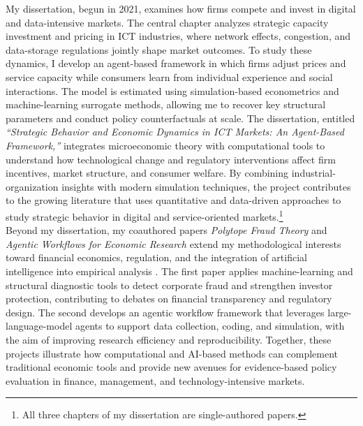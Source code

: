 \documentclass{nfr}
\begin{document}
My dissertation, begun in 2021, examines how firms compete and invest in digital and data-intensive markets. 
The central chapter analyzes strategic capacity investment and pricing in ICT industries, where network effects, congestion, and data-storage regulations jointly shape market outcomes. 
To study these dynamics, I develop an agent-based framework in which firms adjust prices and service capacity while consumers learn from individual experience and social interactions. 
The model is estimated using simulation-based econometrics and machine-learning surrogate methods, allowing me to recover key structural parameters and conduct policy counterfactuals at scale.
The dissertation, entitled \textit{“Strategic Behavior and Economic Dynamics in ICT Markets: An Agent-Based Framework,”} integrates microeconomic theory with computational tools to understand how technological change and regulatory interventions affect firm incentives, market structure, and consumer welfare. 
By combining industrial-organization insights with modern simulation techniques, the project contributes to the growing literature that uses quantitative and data-driven approaches to study strategic behavior in digital and service-oriented markets.\footnote{All three chapters of my dissertation are single-authored papers.}\\

Beyond my dissertation, my coauthored papers \textit{Polytope Fraud Theory} and \textit{Agentic Workflows for Economic Research} extend my methodological interests toward financial economics, regulation, and the integration of artificial intelligence into empirical analysis \citep{Zhao2025, Dawid2025}. 
The first paper applies machine-learning and structural diagnostic tools to detect corporate fraud and strengthen investor protection, contributing to debates on financial transparency and regulatory design. 
The second develops an agentic workflow framework that leverages large-language-model agents to support data collection, coding, and simulation, with the aim of improving research efficiency and reproducibility. 
Together, these projects illustrate how computational and AI-based methods can complement traditional economic tools and provide new avenues for evidence-based policy evaluation in finance, management, and technology-intensive markets.\\
\end{document}
